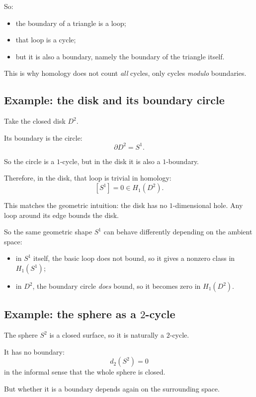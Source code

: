 \documentclass[12pt,a4paper]{article}
\theoremstyle{notespace}
\begin{document}
So:

\begin{itemize}
	\item the boundary of a triangle is a loop;
	\item that loop is a cycle;
	\item but it is also a boundary, namely the boundary of the triangle itself.
\end{itemize}

This is why homology does not count \emph{all} cycles, only cycles \emph{modulo} boundaries.

\subsection{ Example: the disk and its boundary circle}

Take the closed disk \(D^2\).

Its boundary is the circle:
\[
\partial D^2 = S^1.
\]

So the circle is a \(1\)-cycle, but in the disk it is also a \(1\)-boundary.

Therefore, in the disk, that loop is trivial in homology:
\[
[S^1]=0 \in H_1(D^2).
\]

This matches the geometric intuition: the disk has no \(1\)-dimensional hole. Any loop around its edge bounds the disk.

So the same geometric shape \(S^1\) can behave differently depending on the ambient space:

\begin{itemize}
	\item in \(S^1\) itself, the basic loop does not bound, so it gives a nonzero class in \(H_1(S^1)\);
	\item in \(D^2\), the boundary circle \emph{does} bound, so it becomes zero in \(H_1(D^2)\).
\end{itemize}

\subsection{ Example: the sphere as a \(2\)-cycle}

The sphere \(S^2\) is a closed surface, so it is naturally a \(2\)-cycle.

It has no boundary:
\[
d_2(S^2)=0
\]
in the informal sense that the whole sphere is closed.

But whether it is a boundary depends again on the surrounding space.
\end{document}
